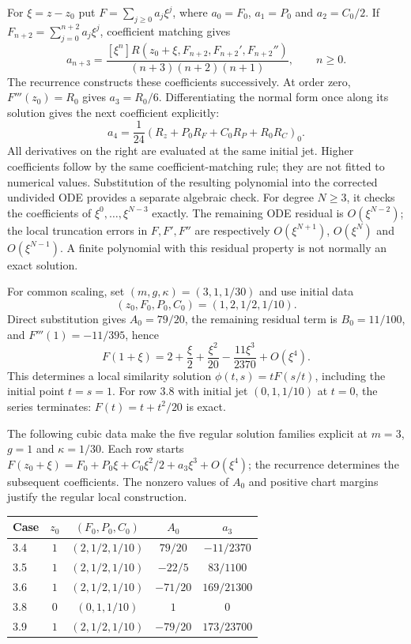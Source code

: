 For $\xi=z-z_0$ put $F=\sum_{j\geq0}a_j\xi^j$, where
$a_0=F_0$, $a_1=P_0$ and $a_2=C_0/2$. If
$F_{n+2}=\sum_{j=0}^{n+2}a_j\xi^j$, coefficient matching gives
\begin{equation}
 a_{n+3}=
 \frac{[\xi^n]R(z_0+\xi,F_{n+2},F_{n+2}',F_{n+2}'')}
 {(n+3)(n+2)(n+1)},\qquad n\geq0.
 \label{eq:sve-series-recurrence}
\end{equation}
The recurrence constructs these coefficients successively. At order zero,
$F'''(z_0)=R_0$ gives $a_3=R_0/6$. Differentiating the normal form once
along its solution gives the next coefficient explicitly:
\[
 a_4=\frac1{24}\left(R_z+P_0R_F+C_0R_P+R_0R_C\right)_0.
\]
All derivatives on the right are evaluated at the same initial jet. Higher
coefficients follow by the same coefficient-matching rule; they are not
fitted to numerical values. Substitution of the resulting polynomial into
the corrected undivided ODE provides a separate algebraic check. For degree $N\geq3$, it checks the coefficients of
$\xi^0,\ldots,\xi^{N-3}$ exactly. The remaining ODE residual is
$O(\xi^{N-2})$; the local truncation errors in $F,F',F''$ are respectively
$O(\xi^{N+1})$, $O(\xi^N)$ and $O(\xi^{N-1})$. A finite polynomial with
this residual property is not normally an exact solution.

For common scaling, set $(m,g,\kappa)=(3,1,1/30)$ and use initial data
\[
 (z_0,F_0,P_0,C_0)=(1,2,1/2,1/10).
\]
Direct substitution gives
$A_0=79/20$, the remaining residual term is $B_0=11/100$, and $F'''(1)=-11/395$, hence
\[
 F(1+\xi)=2+\frac{\xi}{2}+\frac{\xi^2}{20}
             -\frac{11\xi^3}{2370}+O(\xi^4).
\]
This determines a local similarity solution $\phi(t,s)=tF(s/t)$, including
the initial point $t=s=1$. For row 3.8 with initial jet $(0,1,1/10)$ at
$t=0$, the series terminates: $F(t)=t+t^2/20$ is exact.

The following cubic data make the five regular solution families explicit
at $m=3$, $g=1$ and $\kappa=1/30$. Each row starts
$F(z_0+\xi)=F_0+P_0\xi+C_0\xi^2/2+a_3\xi^3+O(\xi^4)$;
the recurrence determines the subsequent coefficients. The nonzero values
of $A_0$ and positive chart margins justify the regular local construction.
\begin{center}\small
\begin{tabular}{@{}lcccc@{}}
\toprule
Case & $z_0$ & $(F_0,P_0,C_0)$ & $A_0$ & $a_3$\\
\midrule
3.4 & $1$ & $(2,1/2,1/10)$ & $79/20$ & $-11/2370$\\
3.5 & $1$ & $(2,1/2,1/10)$ & $-22/5$ & $83/1100$\\
3.6 & $1$ & $(2,1/2,1/10)$ & $-71/20$ & $169/21300$\\
3.8 & $0$ & $(0,1,1/10)$ & $1$ & $0$\\
3.9 & $1$ & $(2,1/2,1/10)$ & $-79/20$ & $173/23700$\\
\bottomrule
\end{tabular}
\end{center}

